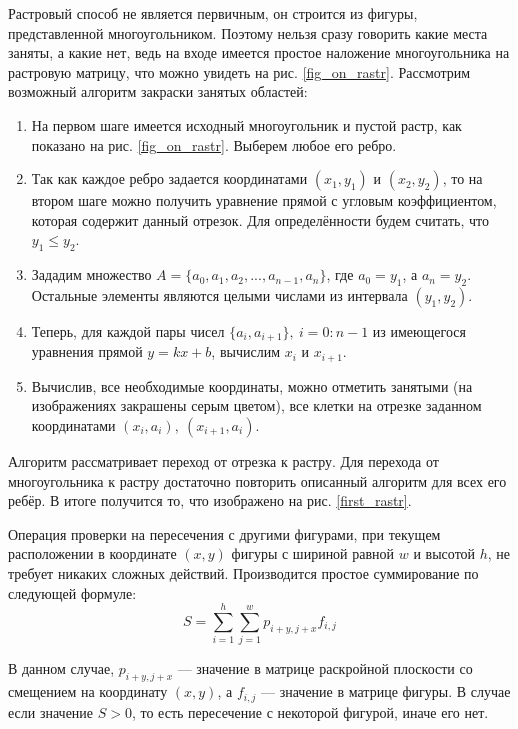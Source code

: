 \documentclass[14pt]{extarticle}
\begin{document}
	Растровый способ не является первичным, он строится из фигуры, представленной многоугольником.
	Поэтому нельзя сразу говорить какие места заняты, а какие нет, ведь на входе имеется простое наложение многоугольника на растровую матрицу, что можно увидеть на рис. \ref{fig_on_rastr}.
	Рассмотрим возможный алгоритм закраски занятых областей:
	\begin{enumerate}
		\item На первом шаге имеется исходный многоугольник и пустой растр, как показано на рис. \ref{fig_on_rastr}. Выберем любое его ребро.
		\item Так как каждое ребро задается координатами $(x_1 , y_1 )$ и $(x_2 , y_2 )$, то на втором шаге можно получить уравнение прямой с угловым коэффициентом, которая содержит данный
		отрезок. Для определённости будем считать, что $y_1 \leq y_2$.
		\item Зададим множество $A=\{a_0, a_1, a_2, ..., a_{n-1}, a_n\}$, где $a_0=y_1$, а $a_n = y_2$. Остальные элементы являются целыми числами из интервала $(y_1, y_2)$.  
		\item Теперь, для каждой пары чисел $\{a_i, a_{i+1}\},\ i = 0:n-1$ из имеющегося уравнения прямой $y=kx+b$, вычислим $x_i$ и $x_{i+1}$.
		\item Вычислив, все необходимые координаты, можно отметить занятыми (на изображениях закрашены серым цветом), все клетки на отрезке заданном координатами $(x_i, a_i),\ (x_{i+1}, a_i)$.
	\end{enumerate}
	\begin{multicols}{1}
		
		
	\end{multicols}

	Алгоритм рассматривает переход от отрезка к растру. Для перехода от многоугольника к растру достаточно повторить описанный алгоритм для всех его ребёр. В итоге получится то, что изображено на рис. \ref{first_rastr}.
	


	Операция проверки на пересечения с другими фигурами, при текущем расположении в координате $(x, y)$ фигуры с шириной равной $w$ и высотой $h$, не требует никаких сложных действий. Производится простое суммирование по следующей формуле:
	\begin{equation}
		\label{simple_sum}
		S = \sum_{i=1}^{h}\sum_{j=1}^{w}p_{i+y, j+x}f_{i,j} 
	\end{equation}


	В данном случае, $p_{i+y,j+x}$ --- значение в матрице раскройной плоскости со смещением на координату $(x, y)$, а $f_{i,j}$ --- значение в матрице фигуры. В случае если значение $S > 0$, то есть пересечение с некоторой фигурой, иначе его нет.
\end{document}
